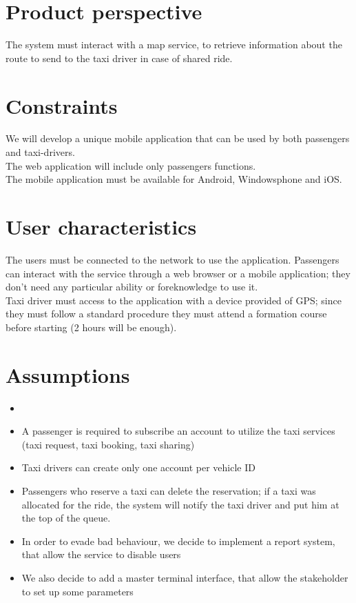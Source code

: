 \section{Product perspective}
The system must interact with a map service, to retrieve information about the route to send to the taxi driver in case of shared ride.


\section{Constraints}
We will develop a unique mobile application that can be used by both passengers and taxi-drivers.\\
The web application will include only passengers functions.\\
The mobile application must be available for Android, Windowsphone and iOS.\\


\section{User characteristics}
The users must be connected to the network to use the application.
Passengers can interact with the service through a web browser or a mobile application; they don't need any particular 
ability or foreknowledge to use it.\\
Taxi driver must access to the application with a device provided of GPS; since they must follow a standard procedure 
they must attend a formation course before starting (2 hours will be enough).\\


\section{Assumptions}
\begin{itemize}
  \item
  \item A passenger is required to subscribe an account to utilize the taxi services (taxi request, taxi booking, taxi sharing)
  \item Taxi drivers can create only one account per vehicle ID
  \item Passengers who reserve a taxi can delete the reservation; if a taxi was allocated for the ride, 
  the system will notify the taxi driver and put him at the top of the queue.
  \item In order to evade bad behaviour, we decide to implement a report system, that allow the service to disable users
  \item We also decide to add a master terminal interface, that allow the stakeholder to set up some parameters
\end{itemize} 

